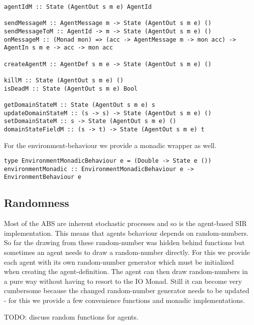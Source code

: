 \begin{verbatim}
agentIdM :: State (AgentOut s m e) AgentId

sendMessageM :: AgentMessage m -> State (AgentOut s m e) ()
sendMessageToM :: AgentId -> m -> State (AgentOut s m e) ()
onMessageM :: (Monad mon) => (acc -> AgentMessage m -> mon acc) -> AgentIn s m e -> acc -> mon acc

createAgentM :: AgentDef s m e -> State (AgentOut s m e) ()

killM :: State (AgentOut s m e) ()
isDeadM :: State (AgentOut s m e) Bool

getDomainStateM :: State (AgentOut s m e) s
updateDomainStateM :: (s -> s) -> State (AgentOut s m e) ()
setDomainStateM :: s -> State (AgentOut s m e) ()
domainStateFieldM :: (s -> t) -> State (AgentOut s m e) t
\end{verbatim}

For the environment-behaviour we provide a monadic wrapper as well.

\begin{verbatim}
type EnvironmentMonadicBehaviour e = (Double -> State e ())
environmentMonadic :: EnvironmentMonadicBehaviour e -> EnvironmentBehaviour e
\end{verbatim}

\subsection{Randomness}
Most of the ABS are inherent stochastic processes and so is the agent-based SIR implementation. This means that agents behaviour depends on random-numbers. So far the drawing from these random-number was hidden behind functions but sometimes an agent needs to draw a random-number directly. For this we provide each agent with its own random-number generator which must be initialized when creating the agent-definition. The agent can then draw random-numbers in a pure way without having to resort to the IO Monad. Still it can become very cumbersome because the changed random-number generator needs to be updated - for this we provide a few convenience functions and monadic implementations.

TODO: discuss random functions for agents.